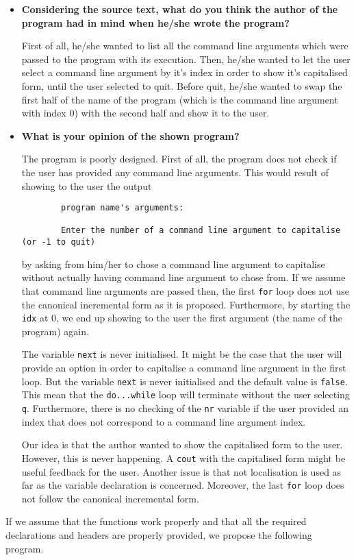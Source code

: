 \documentclass[a4paper]{article}
\newcounter{exerciseCount}
\newcommand{\exercise}[1]{\addtocounter{exerciseCount}{1} \noindent \medskip {\large \textsf{\textbf{Exercise \arabic{exerciseCount} #1}}} \par}
\begin{document}
\begin{itemize}
	\item \textbf{Considering the source text, what do you think the author of the program had in mind when he/she wrote the program?}
	
	First of all, he/she wanted to list all the command line arguments which were passed to the program with its execution. Then, he/she wanted to let the user select a command line argument by it's index in order to show it's capitalised form, until the user selected to quit. Before quit, he/she wanted to swap the first half of the name of the program (which is the command line argument with index 0) with the second half and show it to the user.
	
	\item \textbf{What is your opinion of the shown program?}
	
	The program is poorly designed. First of all, the program does not check if the user has provided any command line arguments. This would result of showing to the user the output
	
	\begin{verbatim}
		program name's arguments:
		
		Enter the number of a command line argument to capitalise (or -1 to quit)
	\end{verbatim}
	
	by asking from him/her to chose a command line argument to capitalise without actually having command line argument to chose from. If we assume that command line arguments are passed then, the first \verb|for| loop does not use the canonical incremental form as it is proposed. Furthermore, by starting the \verb|idx| at 0, we end up showing to the user the first argument (the name of the program) again.
	
	The variable \verb|next| is never initialised. It might be the case that the user will provide an option in order to capitalise a command line argument in the first loop. But the variable \verb|next| is never initialised and the default value is \verb|false|. This mean that the \verb|do...while| loop will terminate without the user selecting \verb|q|. Furthermore, there is no checking of the \verb|nr| variable if the user provided an index that does not correspond to a command line argument index.
	
	Our idea is that the author wanted to show the capitalised form to the user. However, this is never happening. A \verb|cout| with the capitalised form might be useful feedback for the user. Another issue is that not localisation is used as far as the variable declaration is concerned. Moreover, the last \verb|for| loop does not follow the canonical incremental form.
\end{itemize}

If we assume that the functions work properly and that all the required declarations and headers are properly provided, we propose the following program.




%
\end{document}
